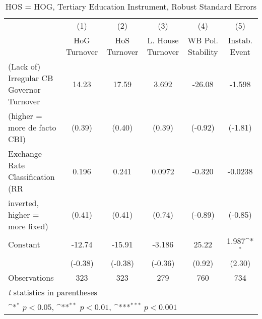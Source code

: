 \begin{table}[htbp]\centering
\def\sym#1{\ifmmode^{#1}\else\(^{#1}\)\fi}
\caption{HOS = HOG, Tertiary Education Instrument, Robust Standard Errors \label{hoshogfivs2}}
\begin{tabular}{l*{5}{c}}
\toprule
                                        &\multicolumn{1}{c}{(1)}&\multicolumn{1}{c}{(2)}&\multicolumn{1}{c}{(3)}&\multicolumn{1}{c}{(4)}&\multicolumn{1}{c}{(5)}\\
                                        &\multicolumn{1}{c}{HoG Turnover}&\multicolumn{1}{c}{HoS Turnover}&\multicolumn{1}{c}{L. House Turnover}&\multicolumn{1}{c}{WB Pol. Stability}&\multicolumn{1}{c}{Instab. Event}\\
\midrule
(Lack of) Irregular CB Governor Turnover&    14.23         &    17.59         &    3.692         &   -26.08         &   -1.598         \\
(higher = more de facto CBI)            &   (0.39)         &   (0.40)         &   (0.39)         &  (-0.92)         &  (-1.81)         \\
\addlinespace
Exchange Rate Classification (RR        &    0.196         &    0.241         &   0.0972         &   -0.320         &  -0.0238         \\
inverted, higher = more fixed)          &   (0.41)         &   (0.41)         &   (0.74)         &  (-0.89)         &  (-0.85)         \\
\addlinespace
Constant                                &   -12.74         &   -15.91         &   -3.186         &    25.22         &    1.987\sym{*}  \\
                                        &  (-0.38)         &  (-0.38)         &  (-0.36)         &   (0.92)         &   (2.30)         \\
\midrule
Observations                            &      323         &      323         &      279         &      760         &      734         \\
\bottomrule
\multicolumn{6}{l}{\footnotesize \textit{t} statistics in parentheses}\\
\multicolumn{6}{l}{\footnotesize \sym{*} \(p<0.05\), \sym{**} \(p<0.01\), \sym{***} \(p<0.001\)}\\
\end{tabular}
\end{table}

